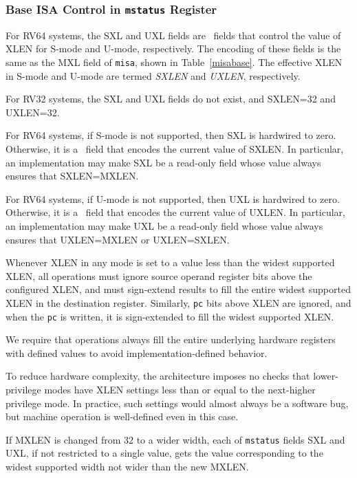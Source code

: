 \subsubsection{Base ISA Control in {\tt mstatus} Register}
\label{xlen-control}

For RV64 systems, the SXL and UXL fields are \warl\ fields
that control the value of XLEN for S-mode and U-mode,
respectively. The encoding of these fields is the same as the MXL
field of {\tt misa}, shown in Table~\ref{misabase}.  The effective
XLEN in S-mode and U-mode are termed {\em SXLEN} and {\em UXLEN},
respectively.

For RV32 systems, the SXL and UXL fields do not exist, and
SXLEN=32 and UXLEN=32.

For RV64 systems, if S-mode is not supported, then SXL is hardwired
to zero.  Otherwise, it is a \warl\ field that encodes the current value of
SXLEN.  In particular, an implementation may make SXL be a read-only
field whose value always ensures that SXLEN=MXLEN.

For RV64 systems, if U-mode is not supported, then UXL is hardwired
to zero.  Otherwise, it is a \warl\ field that encodes the current value of
UXLEN.  In particular, an implementation may make UXL be a read-only
field whose value always ensures that UXLEN=MXLEN or UXLEN=SXLEN.

Whenever XLEN in any mode is set to a value less than the widest
supported XLEN, all operations must ignore source operand register
bits above the configured XLEN, and must sign-extend results to fill
the entire widest supported XLEN in the destination register.
Similarly, {\tt pc} bits above XLEN are ignored, and when the {\tt pc}
is written, it is sign-extended to fill the widest supported XLEN.
\begin{commentary}
We require that operations always fill the entire underlying hardware
registers with defined values to avoid implementation-defined
behavior.

To reduce hardware complexity, the architecture imposes no checks that
lower-privilege modes have XLEN settings less than or equal to the
next-higher privilege mode.  In practice, such settings would almost
always be a software bug, but machine operation is well-defined even in this
case.
\end{commentary}

If MXLEN is changed from 32 to a wider width, each of {\tt mstatus} fields SXL and
UXL, if not restricted to a single value, gets the value corresponding to the
widest supported width not wider than the new MXLEN.

